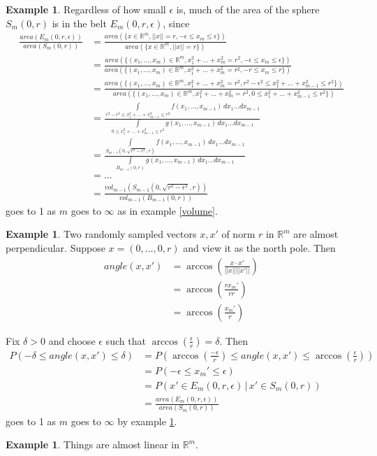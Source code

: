 \documentclass[11pt]{amsart}
\theoremstyle{definition}
\newtheorem{example}[theorem]{Example}
\begin{document}
\begin{example} \label{area} Regardless of how small $\epsilon$ is, much of the area of the sphere $S_m(0, r)$ is in the belt $E_m(0, r, \epsilon)$, since
\begin{align*}
\frac{area(E_m(0, r, \epsilon))}{area(S_m(0, r))} & = \frac{area(\{x \in \mathbb{R}^m, ||x|| = r, -\epsilon \leq x_m \leq \epsilon\})}{area(\{x \in \mathbb{R}^m, ||x|| = r\})} \\
& = \frac{area(\{(x_1, \dots , x_m) \in \mathbb{R}^m, x_1^2 + \dots + x_m^2 = r^2, -\epsilon \leq x_m \leq \epsilon\})}{area(\{(x_1, \dots , x_m) \in \mathbb{R}^m, x_1^2 + \dots + x_m^2 = r^2, -r \leq x_m \leq r\})} \\
& = \frac{area(\{(x_1, \dots , x_m) \in \mathbb{R}^m, x_1^2 + \dots + x_m^2 = r^2, r^2 -\epsilon^2 \leq x_1^2 + \dots + x_{m-1}^2 \leq r^2\})}{area(\{(x_1, \dots , x_m) \in \mathbb{R}^m, x_1^2 + \dots + x_m^2 = r^2, 0 \leq x_1^2 + \dots + x_{m-1}^2 \leq r^2\})} \\
& = \frac{\int\limits_{r^2 -\epsilon^2 \leq x_1^2 + \dots + x_{m-1}^2 \leq r^2} f(x_1, \dots , x_{m-1}) \, dx_1 \dots dx_{m-1}}{\int\limits_{0 \leq x_1^2 + \dots + x_{m-1}^2 \leq r^2} g(x_1, \dots , x_{m-1}) \, dx_1 \dots dx_{m-1}} \\
& = \frac{\int\limits_{S_{m-1}(0, \sqrt{r^2 - \epsilon^2}, r)} f(x_1, \dots , x_{m-1}) \, dx_1 \dots dx_{m-1}}{\int\limits_{B_{m-1}(0, r)} g(x_1, \dots , x_{m-1}) \, dx_1 \dots dx_{m-1}} \\
& = \dots \\
& = \frac{vol_{m-1}(S_{m-1}(0, \sqrt{r^2 - \epsilon^2}, r))}{vol_{m-1}(B_{m-1}(0, r))}
\end{align*}
goes to 1 as $m$ goes to $\infty$ as in example \ref{volume}.
\end{example}

\begin{example} \label{perpendicular} Two randomly sampled vectors $x, x'$ of norm $r$ in $\mathbb{R}^m$ are almost perpendicular. Suppose $x = (0, \dots , 0, r)$ and view it as the north pole. Then
\begin{align*}
angle(x, x') & = \arccos \left( \frac{x \cdot x'}{||x|| ||x'||} \right) \\
 & = \arccos \left( \frac{r x_m'}{r r} \right) \\
 & = \arccos \left( \frac{x_m'}{r} \right)
\end{align*}

Fix $\delta > 0$ and choose $\epsilon$ such that $\arccos \left( \frac{\epsilon}{r} \right) = \delta$. Then
\begin{align*}
P( -\delta \leq angle(x, x') \leq \delta) & = P \left( \arccos \left( \frac{-\epsilon}{r} \right) \leq angle(x, x') \leq \arccos \left( \frac{\epsilon}{r} \right) \right) \\
 & = P(-\epsilon \leq x_m' \leq \epsilon) \\
 & = P(x' \in E_m(0, r, \epsilon) \,|\, x' \in S_m(0, r)) \\
 & = \frac{area(E_m(0, r, \epsilon))}{area(S_m(0, r))}
\end{align*}
goes to 1 as $m$ goes to $\infty$ by example \ref{area}.
\end{example}

\begin{example} \label{linear} Things are almost linear in $\mathbb{R}^m$.
\end{example}
\end{document}
